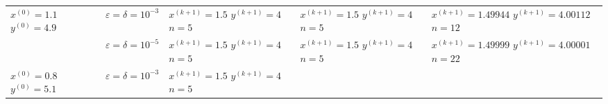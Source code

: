 \begin{table}[h!]
\begin{tabular}{|p{12ex}|l|p{20ex}|p{20ex}|p{20ex}|}
		\(x^{(0)} = 1.1 \) \newline \(y^{(0)} = 4.9\)              &                                                                                                               %
		\(\varepsilon = \delta = 10^{-3} \)                        &                                                                                                               %
		\(x^{(k+1)}=1.5\) \newline \(y^{(k+1)}=4\) \newline\(n=5\) &                                                                                                               %
		\(x^{(k+1)}=1.5\) \newline \(y^{(k+1)}=4\) \newline\(n=5\) &                                                                                                               %
		\(x^{(k+1)}=1.49944\) \newline \(y^{(k+1)}=4.00112\) \newline\(n=12\)                                                                                                       \\ \cline{2-5}
		                                                           & \(\varepsilon = \delta = 10^{-5} \) &                                                                         %
		\(x^{(k+1)}=1.5\) \newline \(y^{(k+1)}=4\) \newline\(n=5\) &                                                                                                               %
		\(x^{(k+1)}=1.5\) \newline \(y^{(k+1)}=4\) \newline\(n=5\) &                                                                                                               %
		\(x^{(k+1)}=1.49999\) \newline \(y^{(k+1)}=4.00001\) \newline\(n=22\)                                                                                                                 \\ \hline
		\(x^{(0)} = 0.8\) \newline \(y^{(0)} = 5.1\)               &                                                                                                               %
		\(\varepsilon = \delta = 10^{-3} \)                        &                                                                                                               %
		\(x^{(k+1)}=1.5\) \newline \(y^{(k+1)}=4\) \newline\(n=5\) &                                                                                                               %

\end{tabular}
\end{table}
